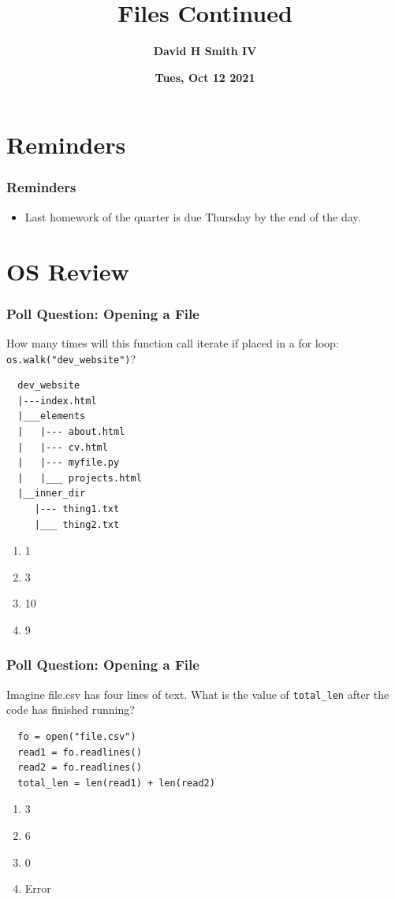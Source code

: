 \documentclass{beamer}
\title{\textbf{Files Continued}}
\author{\textbf{David H Smith IV}}
\institute[\textbf{UIUC}]{\textbf{University of Illinois Urbana-Champaign}}
\date{\textbf{Tues, Oct 12 2021}}
\begin{document}
\frame{\titlepage}

\section{Reminders}

%
%
\begin{frame}
  \frametitle{Reminders}
  \begin{itemize}
    \item Last homework of the quarter is due Thursday by the end of the day.
  \end{itemize}
\end{frame}

\section{OS Review}

\begin{frame}[fragile]
  \frametitle{Poll Question: Opening a File}
  How many times will this function call iterate if placed in a for loop: \lstinline|os.walk("dev_website")|?
  \begin{minipage}{0.74\textwidth}
    \begin{lstlisting}
  dev_website
  |---index.html
  |___elements
  |   |--- about.html
  |   |--- cv.html
  |   |--- myfile.py
  |   |___ projects.html
  |__inner_dir
     |--- thing1.txt
     |___ thing2.txt
    \end{lstlisting} 
  \end{minipage}
  \begin{minipage}{0.24\textwidth}
    \begin{enumerate}[A]
      \item 1
      \item 3
      \item 10
      \item 9
    \end{enumerate}
  \end{minipage}
\end{frame}

%
%
\begin{frame}[fragile]
  \frametitle{Poll Question: Opening a File}
  Imagine file.csv has four lines of text. What is the value of \lstinline|total_len| after the code has finished running?
  \begin{lstlisting}
  fo = open("file.csv")
  read1 = fo.readlines()
  read2 = fo.readlines()
  total_len = len(read1) + len(read2)
  \end{lstlisting} 
  \vfill
  \begin{enumerate}[A]
    \item 3
    \item 6
    \item 0
    \item Error
  \end{enumerate}
\end{frame}
\end{document}
